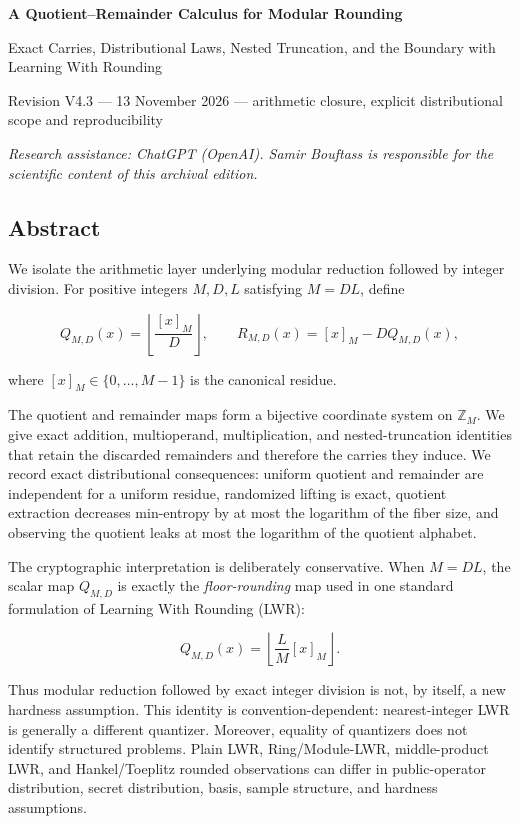 \documentclass[11pt,a4paper]{article}
\begin{document}
{\LARGE\bfseries A Quotient--Remainder Calculus for Modular Rounding\par}
{\large Exact Carries, Distributional Laws, Nested Truncation, and the Boundary with Learning With Rounding\par}
{\small Revision V4.3 — 13 November 2026 — arithmetic closure, explicit distributional scope and reproducibility\par}
{\small\itshape Research assistance: ChatGPT (OpenAI). Samir Bouftass is responsible for the scientific content of this archival edition.\par}
\medskip
\subsection{Abstract}\label{abstract}

We isolate the arithmetic layer underlying modular reduction followed by integer division. For positive integers \(M,D,L\) satisfying \(M=DL\), define

\[
Q_{M,D}(x)=\left\lfloor\frac{[x]_M}{D}\right\rfloor,\qquad
R_{M,D}(x)=[x]_M-DQ_{M,D}(x),
\]

where \([x]_M\in\{0,\ldots,M-1\}\) is the canonical residue.

The quotient and remainder maps form a bijective coordinate system on \(\mathbb Z_M\). We give exact addition, multioperand, multiplication, and nested-truncation identities that retain the discarded remainders and therefore the carries they induce. We record exact distributional consequences: uniform quotient and remainder are independent for a uniform residue, randomized lifting is exact, quotient extraction decreases min-entropy by at most the logarithm of the fiber size, and observing the quotient leaks at most the logarithm of the quotient alphabet.

The cryptographic interpretation is deliberately conservative. When \(M=DL\), the scalar map \(Q_{M,D}\) is exactly the \emph{floor-rounding} map used in one standard formulation of Learning With Rounding (LWR):

\[
Q_{M,D}(x)=\left\lfloor\frac{L}{M}[x]_M\right\rfloor.
\]

Thus modular reduction followed by exact integer division is not, by itself, a new hardness assumption. This identity is convention-dependent: nearest-integer LWR is generally a different quantizer. Moreover, equality of quantizers does not identify structured problems. Plain LWR, Ring/Module-LWR, middle-product LWR, and Hankel/Toeplitz rounded observations can differ in public-operator distribution, secret distribution, basis, sample structure, and hardness assumptions.
\end{document}

